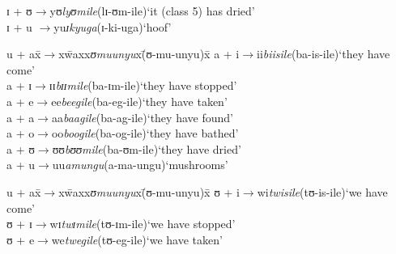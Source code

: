 \begin{exe}
\begin{tabbing}
		ɪ + ʊ\>$\rightarrow$\>yʊ\>\textit{lyʊmile}\>(\degree lɪ-ʊm-ile)\>`it (class 5) has dried'\\
		ɪ + u \>$\rightarrow$\>yu\>\textit{ɪkyuga}\>(\degree ɪ-ki-uga)\>`hoof'
	\end{tabbing}
	\ex
	\begin{tabbing}
		u + ax\=$\rightarrow$x\=waxx\=\textit{ʊmuunyu}x\=(\degree ʊ-mu-unyu)x\=\kill%
		a + i\>$\rightarrow$\>ii\>\textit{biisile}\>(\degree ba-is-ile)\>`they have come'\\
		a + ɪ\>$\rightarrow$\>ɪɪ\>\textit{bɪɪmile}\>(\degree ba-ɪm-ile)\>`they have stopped'\\
		a + e\>$\rightarrow$\>ee\>\textit{beegile}\>(\degree ba-eg-ile)\>`they have taken'\\
		a + a\>$\rightarrow$\>aa\>\textit{baagile}\>(\degree ba-ag-ile)\>`they have found'\\
		a + o\>$\rightarrow$\>oo\>\textit{boogile}\>(\degree ba-og-ile)\>`they have bathed'\\
		a + ʊ\>$\rightarrow$\>ʊʊ\>\textit{bʊʊmile}\>(\degree ba-ʊm-ile)\>`they have dried'\\
		a + u\>$\rightarrow$\>uu\>\textit{amungu}\>(\degree a-ma-ungu)\>`mushrooms'
	\end{tabbing}
	\ex
	\begin{tabbing}
		u + ax\=$\rightarrow$x\=waxx\=\textit{ʊmuunyu}x\=(\degree ʊ-mu-unyu)x\=\kill%
		ʊ + i\>$\rightarrow$\>wi\>\textit{twisile}\>(\degree tʊ-is-ile)\>`we have come'\\
		ʊ + ɪ\>$\rightarrow$\>wɪ\>\textit{twɪmile}\>(\degree tʊ-ɪm-ile)\>`we have stopped'\\
		ʊ + e\>$\rightarrow$\>we\>\textit{twegile}\>(\degree tʊ-eg-ile)\>`we have taken'\\

\end{tabbing}
\end{exe}
